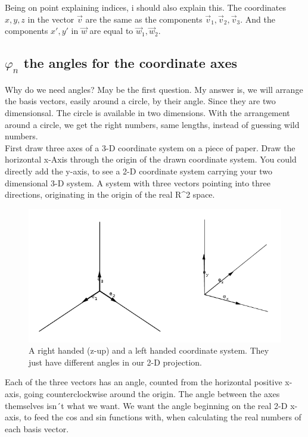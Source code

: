 \documentclass[a4paper]{article}
\begin{document}
Being on point explaining indices, i should also explain this. The coordinates $x,y,z$ in the vector $\vec{v}$ are the same as the components $\vec{v}_{1},\vec{v}_{2},\vec{v}_{3}$. And the components $x', y'$ in $\vec{w}$ are equal to $\vec{w}_{1}, \vec{w}_{2}$.\\

\subsection{$\varphi_{n}$ the angles for the coordinate axes}

Why do we need angles? May be the first question. My answer is, we will arrange the basis vectors,
easily around a circle, by their angle. Since they are two dimensionsal. The circle is available in two dimensions.
With the arrangement around a circle, we get the right numbers, same lengths, instead of guessing wild numbers.\\

First draw three axes of a 3-D coordinate system on a piece of paper. Draw the horizontal x-Axis through the origin of the drawn coordinate system. You could directly add the y-axis, to see a 2-D coordinate system carrying your two dimensional 3-D system. A system with three vectors pointing into three directions, originating in the origin of the real R^2 space.\\

\begin{figure}[ht]
\label{handsystems}
\includegraphics{handsystems.png}
\caption{A right handed (z-up) and a left handed coordinate system. They just have different angles in our 2-D projection.}
\end{figure}

Each of the three vectors has an angle, counted from the horizontal positive x-axis, going counterclockwise around the origin. The
angle between the axes themselves isn´t what we want. We want the angle beginning on the real 2-D x-axis, to feed the cos and sin functions with, when calculating the real numbers of each basis vector.\\
\end{document}
